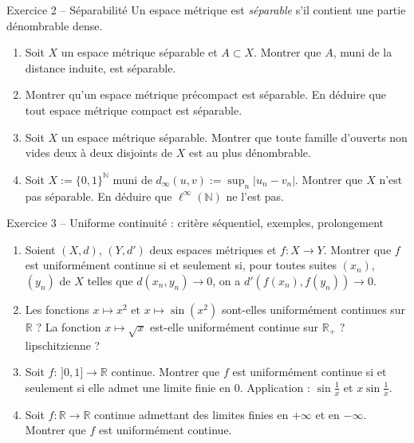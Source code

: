 \documentclass[11pt,a4paper]{article}
\newcommand{\R}{\mathbb{R}}
\newcommand{\N}{\mathbb{N}}
\theoremstyle{definition}
\begin{document}
\begin{exo}{Exercice 2 -- Séparabilité}
Un espace métrique est \emph{séparable} s'il contient une partie dénombrable dense.
\begin{enumerate}[label=(\alph*)]
  \item Soit $X$ un espace métrique séparable et $A\subset X$. Montrer que $A$, muni de la distance induite, est séparable.
  \item Montrer qu'un espace métrique précompact est séparable. En déduire que tout espace métrique compact est séparable.
  \item Soit $X$ un espace métrique séparable. Montrer que toute famille d'ouverts non vides deux à deux disjoints de $X$ est au plus dénombrable.
  \item Soit $X:=\{0,1\}^\N$ muni de $d_\infty(u,v):=\sup_n|u_n-v_n|$. Montrer que $X$ n'est pas séparable. En déduire que $\ell^\infty(\N)$ ne l'est pas.
\end{enumerate}
\end{exo}

\begin{exo}{Exercice 3 -- Uniforme continuité : critère séquentiel, exemples, prolongement}
\begin{enumerate}[label=(\alph*)]
  \item Soient $(X,d)$, $(Y,d')$ deux espaces métriques et $f:X\to Y$. Montrer que $f$ est uniformément continue si et seulement si, pour toutes suites $(x_n)$, $(y_n)$ de $X$ telles que $d(x_n,y_n)\to0$, on a $d'(f(x_n),f(y_n))\to0$.
  \item Les fonctions $x\mapsto x^2$ et $x\mapsto\sin(x^2)$ sont-elles uniformément continues sur $\R$ ? La fonction $x\mapsto\sqrt x$ est-elle uniformément continue sur $\R_+$ ? lipschitzienne ?
  \item Soit $f:\,]0,1]\to\R$ continue. Montrer que $f$ est uniformément continue si et seulement si elle admet une limite finie en $0$. Application : $\sin\frac1x$ et $x\sin\frac1x$.
  \item Soit $f:\R\to\R$ continue admettant des limites finies en $+\infty$ et en $-\infty$. Montrer que $f$ est uniformément continue.
\end{enumerate}
\end{exo}
\end{document}
